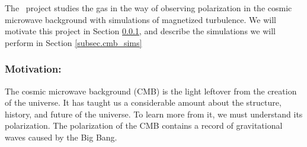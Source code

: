 The \nameCMB\ project studies the gas in the way of observing polarization in
the cosmic microwave background with simulations of magnetized turbulence.
We will
motivate this project in Section \ref{subsec.cmb_motivate}, and describe the
simulations we will perform in Section \ref{subsec.cmb_sims}

\subsubsection{Motivation: \nameCMB}
\label{subsec.cmb_motivate}

The cosmic microwave background (CMB) is the light leftover from the creation of
the universe.  It has taught us a considerable amount about the structure,
history, and future of the
universe.  To learn more from it, we must understand its polarization.  
The polarization of the CMB contains a record of gravitational waves caused by
the Big Bang.  

%

